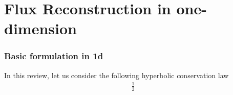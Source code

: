\section{Flux Reconstruction in one-dimension}

\begin{frame} \frametitle{Basic formulation in 1d}
In this review, let us consider the following hyperbolic conservation law
\begin{align}
	\frac{1}{2}
\end{align}

\end{frame}
